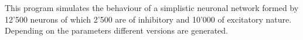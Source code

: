 This program simulates the behaviour of a simplistic neuronal network formed by 12'500 neurons of which 2'500 are of inhibitory and 10'000 of excitatory nature. Depending on the parameters different versions are generated. 
